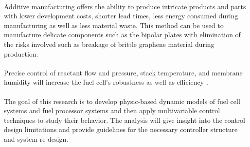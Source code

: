 \paragraph{}Additive manufacturing offers the ability to produce intricate products and parts with lower development costs, shorter lead times, less energy consumed during manufacturing as well as less material waste. This method can be used to manufacture delicate components such as the bipolar plates with elimination of the risks involved such as breakage of brittle graphene material during production.     
\paragraph{}Precise control of reactant flow and pressure, stack temperature, and membrane humidity will increase the fuel cell’s robustness as well as efficiency \cite{stefanopoulou_mechatronics_nodate}\cite{gonzatti_proposal_2017}\cite{thanapalan_model_nodate}.
\paragraph{}The goal of this research is to develop physic-based dynamic models of fuel cell systems and fuel processor systems and then apply multivariable control techniques to study their behavior. The analysis will give insight into the control design limitations and provide guidelines for the necessary controller structure and system re-design.